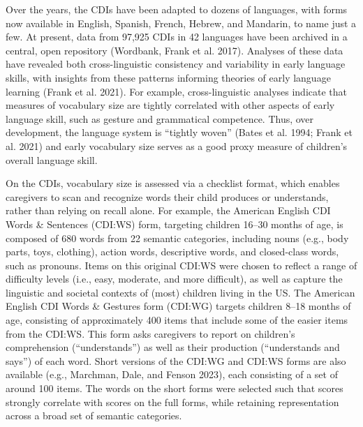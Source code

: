 \documentclass[
  letterpaper,
  DIV=11,
  numbers=noendperiod]{scrartcl}
\begin{document}
Over the years, the CDIs have been adapted to dozens of languages, with
forms now available in English, Spanish, French, Hebrew, and Mandarin,
to name just a few. At present, data from 97,925 CDIs in 42 languages
have been archived in a central, open repository (Wordbank, Frank et al.
2017). Analyses of these data have revealed both cross-linguistic
consistency and variability in early language skills, with insights from
these patterns informing theories of early language learning (Frank et
al. 2021). For example, cross-linguistic analyses indicate that measures
of vocabulary size are tightly correlated with other aspects of early
language skill, such as gesture and grammatical competence. Thus, over
development, the language system is ``tightly woven'' (Bates et al.
1994; Frank et al. 2021) and early vocabulary size serves as a good
proxy measure of children's overall language skill.

On the CDIs, vocabulary size is assessed via a checklist format, which
enables caregivers to scan and recognize words their child produces or
understands, rather than relying on recall alone. For example, the
American English CDI Words \& Sentences (CDI:WS) form, targeting
children 16--30 months of age, is composed of 680 words from 22 semantic
categories, including nouns (e.g., body parts, toys, clothing), action
words, descriptive words, and closed-class words, such as pronouns.
Items on this original CDI:WS were chosen to reflect a range of
difficulty levels (i.e., easy, moderate, and more difficult), as well as
capture the linguistic and societal contexts of (most) children living
in the US. The American English CDI Words \& Gestures form (CDI:WG)
targets children 8--18 months of age, consisting of approximately 400
items that include some of the easier items from the CDI:WS. This form
asks caregivers to report on children's comprehension (``understands'')
as well as their production (``understands and says'') of each word.
Short versions of the CDI:WG and CDI:WS forms are also available (e.g.,
Marchman, Dale, and Fenson 2023), each consisting of a set of around 100
items. The words on the short forms were selected such that scores
strongly correlate with scores on the full forms, while retaining
representation across a broad set of semantic categories.
\end{document}
